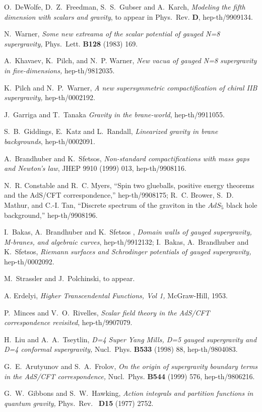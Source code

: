 \documentclass[a4paper,12pt]{article}
\begin{document}
\begin{thebibliography}{99}
 O.~DeWolfe, D.~Z.~Freedman, S.~S.~Gubser and A.~Karch,
{\em Modeling the fifth dimension with scalars and gravity}, to appear
in Phys.~Rev. {\bf D}, hep-th/9909134.


 N.~Warner, {\em Some new extreama of the scalar
potential of gauged N=8 supergravity,} Phys.~Lett. {\bf B128} (1983)
169.

 A.~Khavaev, K.~Pilch, and N.~P. Warner, {\em New vacua
of gauged N=8 supergravity in five-dimensions,} hep-th/9812035.

 K.~Pilch and N.~P.~Warner, {\em A new
supersymmetric compactification of chiral IIB supergravity,}
hep-th/0002192.


 J.~Garriga and T.~Tanaka {\em Gravity in the
brane-world}, hep-th/9911055.

 S.~B.~Giddings, E.~Katz and L.~Randall, {\em Linearized
gravity in brane backgrounds}, hep-th/0002091.

 A.~Brandhuber and K.~Sfetsos, {\em Non-standard
compactifications with mass gaps and Newton's law}, JHEP 9910 (1999)
013, hep-th/9908116.

N.~R. Constable and R.~C. Myers, ``Spin two glueballs, positive energy theorems
  and the AdS/CFT correspondence,'' hep-th/9908175; \hfill \break
R.~C. Brower, S.~D. Mathur, and C.-I. Tan, ``Discrete spectrum of the graviton
  in the $AdS_5$ black hole background,''
hep-th/9908196.


 I.~Bakas, A.~Brandhuber and K.~Sfetsos , {\em Domain
walls of gauged supergravity, M-branes, and algebraic curves},
hep-th/9912132; \hfill \break I.~Bakas, A.~Brandhuber and K.~Sfetsos,
{\em Riemann surfaces and Schrodinger potentials of gauged
supergravity,} hep-th/0002092.

 M.~Strassler and J.~Polchinski, to appear.

 A. Erdelyi, {\em Higher Transcendental Functions,
Vol 1,} McGraw-Hill, 1953.

 P.~Minces and V.~O.~Rivelles, {\em Scalar field theory in
the AdS/CFT correspondence revisited}, hep-th/9907079.

 H.~Liu and A.~A.~Tseytlin, {\em D=4 Super Yang
Mills, D=5 gauged supergravity and D=4 conformal supergravity,}
Nucl.~Phys. {\bf B533} (1998) 88, hep-th/9804083.

 G.~E.~Arutyunov and S.~A.~Frolov, {\em On the origin
of supergravity boundary terms in the AdS/CFT correspondence,}
Nucl.~Phys. {\bf B544} (1999) 576, hep-th/9806216.

 G.~W.~Gibbons and S.~W.~Hawking, {\em Action integrals
and partition functions in quantum gravity,} Phys.~Rev.~ {\bf D15}
(1977) 2752.



\end{thebibliography}
\end{document}
